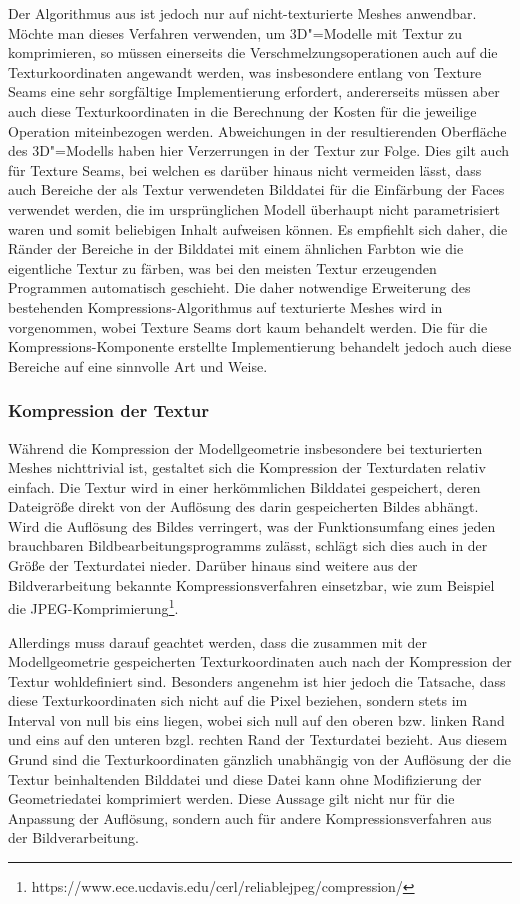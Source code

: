Der Algorithmus aus \cite{garland1997} ist jedoch nur auf nicht-texturierte Meshes anwendbar. Möchte man dieses Verfahren verwenden, um 3D"=Modelle mit Textur zu komprimieren, so müssen einerseits die Verschmelzungsoperationen auch auf die Texturkoordinaten angewandt werden, was insbesondere entlang von Texture Seams eine sehr sorgfältige Implementierung erfordert, andererseits müssen aber auch diese Texturkoordinaten in die Berechnung der Kosten für die jeweilige Operation miteinbezogen werden. Abweichungen in der resultierenden Oberfläche des 3D"=Modells haben hier Verzerrungen in der Textur zur Folge. Dies gilt auch für Texture Seams, bei welchen es darüber hinaus nicht vermeiden lässt, dass auch Bereiche der als Textur verwendeten Bilddatei für die Einfärbung der Faces verwendet werden, die im ursprünglichen Modell überhaupt nicht parametrisiert waren und somit beliebigen Inhalt aufweisen können. Es empfiehlt sich daher, die Ränder der Bereiche in der Bilddatei mit einem ähnlichen Farbton wie die eigentliche Textur zu färben, was bei den meisten Textur erzeugenden Programmen automatisch geschieht. Die daher notwendige Erweiterung des bestehenden Kompressions-Algorithmus auf texturierte Meshes wird in \cite{garland1998} vorgenommen, wobei Texture Seams dort kaum behandelt werden. Die für die Kompressions-Komponente erstellte Implementierung behandelt jedoch auch diese Bereiche auf eine sinnvolle Art und Weise.

\subsubsection{Kompression der Textur}

Während die Kompression der Modellgeometrie insbesondere bei texturierten Meshes nichttrivial ist, gestaltet sich die Kompression der Texturdaten relativ einfach. Die Textur wird in einer herkömmlichen Bilddatei gespeichert, deren Dateigröße direkt von der Auflösung des darin gespeicherten Bildes abhängt. Wird die Auflösung des Bildes verringert, was der Funktionsumfang eines jeden brauchbaren Bildbearbeitungsprogramms zulässt, schlägt sich dies auch in der Größe der Texturdatei nieder. Darüber hinaus sind weitere aus der Bildverarbeitung bekannte Kompressionsverfahren einsetzbar, wie zum Beispiel die JPEG-Komprimierung\footnote{https://www.ece.ucdavis.edu/cerl/reliablejpeg/compression/}.

Allerdings muss darauf geachtet werden, dass die zusammen mit der Modellgeometrie gespeicherten Texturkoordinaten auch nach der Kompression der Textur wohldefiniert sind. Besonders angenehm ist hier jedoch die Tatsache, dass diese Texturkoordinaten sich nicht auf die Pixel beziehen, sondern stets im Interval von null bis eins liegen, wobei sich null auf den oberen bzw. linken Rand und eins auf den unteren bzgl. rechten Rand der Texturdatei bezieht. Aus diesem Grund sind die Texturkoordinaten gänzlich unabhängig von der Auflösung der die Textur beinhaltenden Bilddatei und diese Datei kann ohne Modifizierung der Geometriedatei komprimiert werden. Diese Aussage gilt nicht nur für die Anpassung der Auflösung, sondern auch für andere Kompressionsverfahren aus der Bildverarbeitung.


